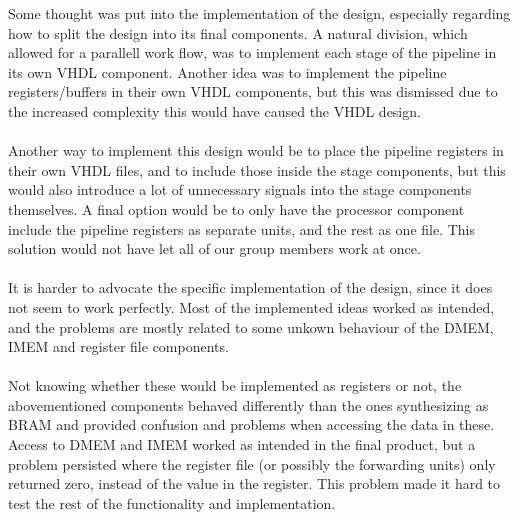 Some thought was put into the implementation of the design, especially regarding
how to split the design into its final components. A natural division, which
allowed for a parallell work flow, was to implement each stage of the pipeline
in its own VHDL component. Another idea was to implement the pipeline
registers/buffers in their own VHDL components, but this was dismissed due to
the increased complexity this would have caused the VHDL design.
\paragraph*{}
Another way to implement this design would be to place the pipeline registers in
their own VHDL files, and to include those inside the stage components, but this
would also introduce a lot of unnecessary signals into the stage components
themselves. A final option would be to only have the processor component include
the pipeline registers as separate units, and the rest as one file. This solution would not have
let all of our group members work at once.
\paragraph*{}
It is harder to advocate the specific implementation of the design, since it
does not seem to work perfectly. Most of the implemented ideas worked as intended, and
the problems are mostly related to some unkown behaviour of the DMEM, IMEM and
register file components.
\paragraph*{}
Not knowing whether these would be implemented as registers or not, the
abovementioned components behaved differently than the ones
synthesizing as BRAM and provided confusion and problems when accessing the data
in these. Access to DMEM and IMEM worked as intended in the final product, but a
problem persisted where the register file (or possibly the forwarding units)
only returned zero, instead of the value in the register. This problem made it
hard to test the rest of the functionality and implementation.
